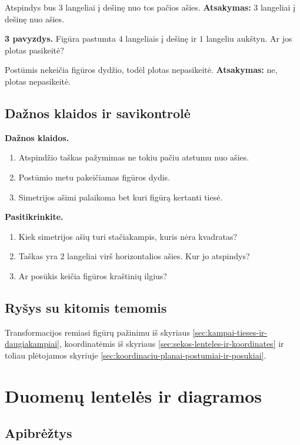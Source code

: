 Atspindys bus \(3\) langeliai į dešinę nuo tos pačios ašies.
\textbf{Atsakymas:} \(3\) langeliai į dešinę nuo ašies.

\textbf{3 pavyzdys.} Figūra pastumta \(4\) langeliais į dešinę ir \(1\) langeliu aukštyn. Ar jos plotas pasikeitė?

Postūmis nekeičia figūros dydžio, todėl plotas nepasikeitė.
\textbf{Atsakymas:} ne, plotas nepasikeitė.

\subsection{Dažnos klaidos ir savikontrolė}

\textbf{Dažnos klaidos.}
\begin{enumerate}[label=\arabic*.]
\item Atspindžio taškas pažymimas ne tokiu pačiu atstumu nuo ašies.
\item Postūmio metu pakeičiamas figūros dydis.
\item Simetrijos ašimi palaikoma bet kuri figūrą kertanti tiesė.
\end{enumerate}

\textbf{Pasitikrinkite.}
\begin{enumerate}[label=\arabic*.]
\item Kiek simetrijos ašių turi stačiakampis, kuris nėra kvadratas?
\item Taškas yra \(2\) langeliai virš horizontalios ašies. Kur jo atspindys?
\item Ar posūkis keičia figūros kraštinių ilgius?
\end{enumerate}

\subsection{Ryšys su kitomis temomis}

Transformacijos remiasi figūrų pažinimu iš skyriaus \ref{sec:kampai-tieses-ir-daugiakampiai}, koordinatėmis iš skyriaus \ref{sec:sekos-lenteles-ir-koordinates} ir toliau plėtojamos skyriuje \ref{sec:koordinaciu-planai-postumiai-ir-posukiai}.

\section{Duomenų lentelės ir diagramos}\label{sec:duomenu-lenteles-ir-diagramos}

\subsection{Apibrėžtys}

